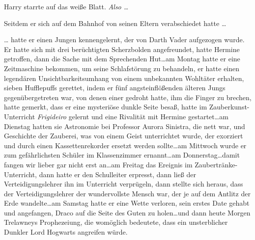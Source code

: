 Harry starrte auf das weiße Blatt. \emph{Also …}

Seitdem er sich auf dem Bahnhof von seinen Eltern verabschiedet hatte …

… hatte er einen Jungen kennengelernt, der von Darth Vader aufgezogen wurde. Er hatte sich mit drei berüchtigten Scherzbolden angefreundet, hatte Hermine getroffen, dann die Sache mit dem Sprechenden Hut…am Montag hatte er eine Zeitmaschine bekommen, um seine Schlafstörung zu behandeln, er hatte einen legendären Unsichtbarkeitsumhang von einem unbekannten Wohltäter erhalten, sieben Hufflepuffs gerettet, indem er fünf angsteinflößenden älteren Jungs gegenübergetreten war, von denen einer gedroht hatte, ihm die Finger zu brechen, hatte gemerkt, dass er eine mysteriöse dunkle Seite besaß, hatte im Zauberkunst-Unterricht \emph{Frigideiro} gelernt und eine Rivalität mit Hermine gestartet…am Dienstag hatten sie Astronomie bei Professor Aurora Sinistra, die nett war, und Geschichte der Zauberei, was von einem Geist unterrichtet wurde, der exorziert und durch einen Kassettenrekorder ersetzt werden sollte…am Mittwoch wurde er zum gefährlichsten Schüler im Klassenzimmer ernannt…am Donnerstag…damit fangen wir lieber gar nicht erst an…am Freitag das Ereignis im Zaubertränke-Unterricht, dann hatte er den Schulleiter erpresst, dann ließ der Verteidigungslehrer ihn im Unterricht verprügeln, dann stellte sich heraus, dass der Verteidigungslehrer der wundervollste Mensch war, der je auf dem Antlitz der Erde wandelte…am Samstag hatte er eine Wette verloren, sein erstes Date gehabt und angefangen, Draco auf die Seite des Guten zu holen…und dann heute Morgen Trelawneys Prophezeiung, die womöglich bedeutete, dass ein unsterblicher Dunkler Lord Hogwarts angreifen würde.

